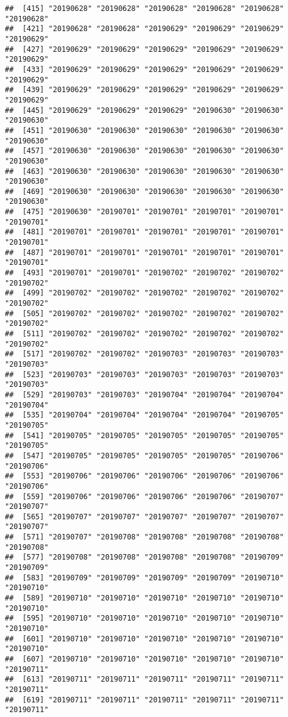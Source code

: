 \documentclass[]{article}
\begin{document}
\begin{verbatim}
##  [415] "20190628" "20190628" "20190628" "20190628" "20190628" "20190628"
##  [421] "20190628" "20190628" "20190629" "20190629" "20190629" "20190629"
##  [427] "20190629" "20190629" "20190629" "20190629" "20190629" "20190629"
##  [433] "20190629" "20190629" "20190629" "20190629" "20190629" "20190629"
##  [439] "20190629" "20190629" "20190629" "20190629" "20190629" "20190629"
##  [445] "20190629" "20190629" "20190629" "20190630" "20190630" "20190630"
##  [451] "20190630" "20190630" "20190630" "20190630" "20190630" "20190630"
##  [457] "20190630" "20190630" "20190630" "20190630" "20190630" "20190630"
##  [463] "20190630" "20190630" "20190630" "20190630" "20190630" "20190630"
##  [469] "20190630" "20190630" "20190630" "20190630" "20190630" "20190630"
##  [475] "20190630" "20190701" "20190701" "20190701" "20190701" "20190701"
##  [481] "20190701" "20190701" "20190701" "20190701" "20190701" "20190701"
##  [487] "20190701" "20190701" "20190701" "20190701" "20190701" "20190701"
##  [493] "20190701" "20190701" "20190702" "20190702" "20190702" "20190702"
##  [499] "20190702" "20190702" "20190702" "20190702" "20190702" "20190702"
##  [505] "20190702" "20190702" "20190702" "20190702" "20190702" "20190702"
##  [511] "20190702" "20190702" "20190702" "20190702" "20190702" "20190702"
##  [517] "20190702" "20190702" "20190703" "20190703" "20190703" "20190703"
##  [523] "20190703" "20190703" "20190703" "20190703" "20190703" "20190703"
##  [529] "20190703" "20190703" "20190704" "20190704" "20190704" "20190704"
##  [535] "20190704" "20190704" "20190704" "20190704" "20190705" "20190705"
##  [541] "20190705" "20190705" "20190705" "20190705" "20190705" "20190705"
##  [547] "20190705" "20190705" "20190705" "20190705" "20190706" "20190706"
##  [553] "20190706" "20190706" "20190706" "20190706" "20190706" "20190706"
##  [559] "20190706" "20190706" "20190706" "20190706" "20190707" "20190707"
##  [565] "20190707" "20190707" "20190707" "20190707" "20190707" "20190707"
##  [571] "20190707" "20190708" "20190708" "20190708" "20190708" "20190708"
##  [577] "20190708" "20190708" "20190708" "20190708" "20190709" "20190709"
##  [583] "20190709" "20190709" "20190709" "20190709" "20190710" "20190710"
##  [589] "20190710" "20190710" "20190710" "20190710" "20190710" "20190710"
##  [595] "20190710" "20190710" "20190710" "20190710" "20190710" "20190710"
##  [601] "20190710" "20190710" "20190710" "20190710" "20190710" "20190710"
##  [607] "20190710" "20190710" "20190710" "20190710" "20190710" "20190711"
##  [613] "20190711" "20190711" "20190711" "20190711" "20190711" "20190711"
##  [619] "20190711" "20190711" "20190711" "20190711" "20190711" "20190711"

\end{verbatim}
\end{document}
